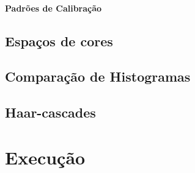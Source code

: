 \documentclass[ecp,tc]{iiufrgs}
\begin{document}
\subsubsection{Padrões de Calibração}

\section{Espaços de cores}

\section{Comparação de Histogramas}

\section{Haar-cascades}

\chapter{Execução}
\end{document}
